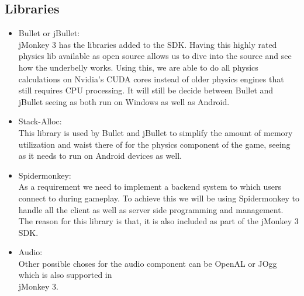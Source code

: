 \documentclass[letterpaper]{article}
\begin{document}
			\vspace{0.1cm}
			
			\subsection*{Libraries}
			
			\vspace{0.1cm}
			
			\begin{itemize}
				\item Bullet or jBullet: \\
					jMonkey 3 has the libraries added to the SDK. Having this highly rated physics lib available as open source allows us to dive into the source and see how the underbelly works. Using this, we are able to do all physics calculations on Nvidia's CUDA cores instead of older physics engines that still requires CPU processing. It will still be decide between Bullet and jBullet seeing as both run on Windows as well as Android.
					
				\item Stack-Alloc: \\
					This library is used by Bullet and jBullet to simplify the amount of memory utilization and waist there of for the physics component of the game, seeing as it needs to run on Android devices as well.
				
				\item Spidermonkey:\\
					As a requirement we need to implement a backend system to which users connect to during gameplay. To achieve this we will be using Spidermonkey to handle all the client as well as server side programming and management. The reason for this library is that, it is also included as part of the jMonkey 3 SDK.
				
				\item Audio: \\
					Other possible choses for the audio component can be OpenAL or JOgg which is also supported in \\ jMonkey 3.
									

\end{itemize}
\end{document}
